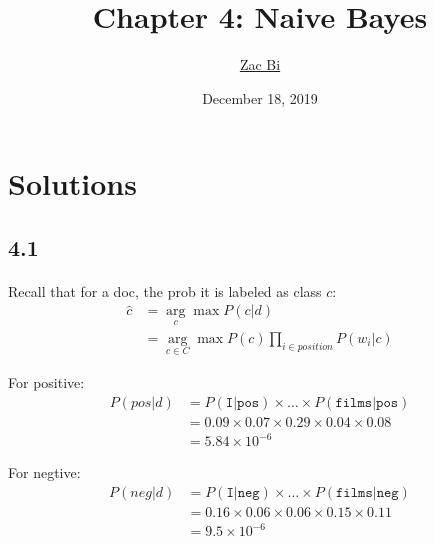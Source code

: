\documentclass{article}
\begin{document}
\begin{titlepage}
    \title{Chapter 4: Naive Bayes}
    \author{\href{https://github.com/ZacBi}{Zac Bi}}
    \date{December 18, 2019}
    \maketitle
    \thispagestyle{empty}
\end{titlepage}


\section*{Solutions}

\subsection*{4.1}
\paragraph*{}
Recall that for a doc, the prob it is labeled as class $c$:
\begin{align*}
    \hat{c} & = \mathop{arg} \limits_{c} \max P(c|d)                                                       \\
            & = \mathop{arg} \limits_{c \in C} \max P(c) \! \prod_{i \in position} \!\!\!\!\!\!\! P(w_i|c)
\end{align*}


For positive:
\begin{align*}
    P(pos|d) & = P(\texttt{I|pos}) \times \dots \times P(\texttt{films|pos}) \\
             & = 0.09 \times 0.07 \times 0.29 \times 0.04 \times 0.08        \\
             & = 5.84 \times 10^{-6}
\end{align*}

For negtive:
\begin{align*}
    P(neg|d) & = P(\texttt{I|neg}) \times \dots \times P(\texttt{films|neg}) \\
             & = 0.16 \times 0.06 \times 0.06 \times 0.15 \times 0.11        \\
             & = 9.5 \times 10^{-6}
\end{align*}
\end{document}
